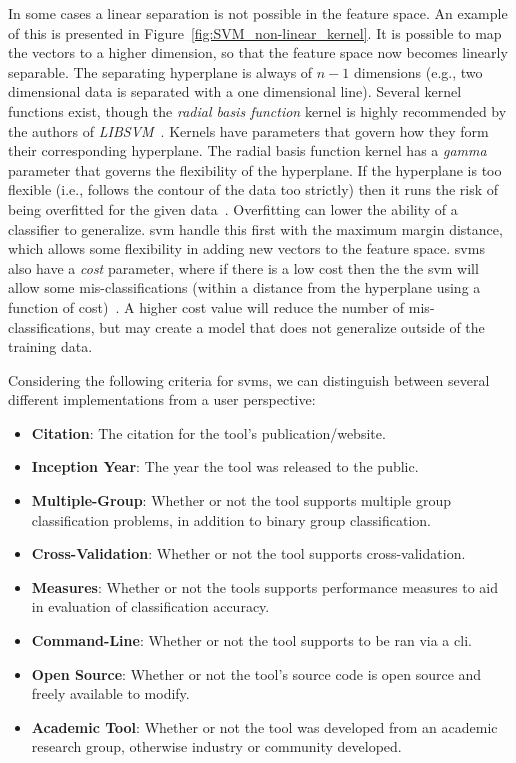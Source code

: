 In some cases a linear separation is not possible in the feature space. An example of this is presented in Figure~\ref{fig:SVM_non-linear_kernel}. It is possible to map the vectors to a higher dimension, so that the feature space now becomes linearly separable. The separating hyperplane is always of $n-1$ dimensions (e.g., two dimensional data is separated with a one dimensional line). Several kernel functions exist, though the \emph{radial basis function} kernel is highly recommended by the authors of \emph{LIBSVM}~\cite{HCL03}. Kernels have parameters that govern how they form their corresponding hyperplane. The radial basis function kernel has a \emph{gamma} parameter that governs the flexibility of the hyperplane. If the hyperplane is too flexible (i.e., follows the contour of the data too strictly) then it runs the risk of being overfitted for the given data~\cite{BW10}. Overfitting can lower the ability of a classifier to generalize. \gls{svm} handle this first with the maximum margin distance, which allows some flexibility in adding new vectors to the feature space. \gls{svm}s also have a \emph{cost} parameter, where if there is a low cost then the the \gls{svm} will allow some mis-classifications (within a distance from the hyperplane using a function of cost)~\cite{BW10}. A higher cost value will reduce the number of mis-classifications, but may create a model that does not generalize outside of the training data.

Considering the following criteria for \gls{svm}s, we can distinguish between several different implementations from a user perspective:

\begin{itemize}
  \item \textbf{Citation}: The citation for the tool's publication/website.
  \item \textbf{Inception Year}: The year the tool was released to the public.
  \item \textbf{Multiple-Group}: Whether or not the tool supports multiple group classification problems, in addition to binary group classification.
  \item \textbf{Cross-Validation}: Whether or not the tool supports cross-validation.
  \item \textbf{Measures}: Whether or not the tools supports performance measures to aid in evaluation of classification accuracy.
  \item \textbf{Command-Line}: Whether or not the tool supports to be ran via a \gls{cli}.
  \item \textbf{Open Source}: Whether or not the tool's source code is open source and freely available to modify.
  \item \textbf{Academic Tool}: Whether or not the tool was developed from an academic research group, otherwise industry or community developed.
\end{itemize}

